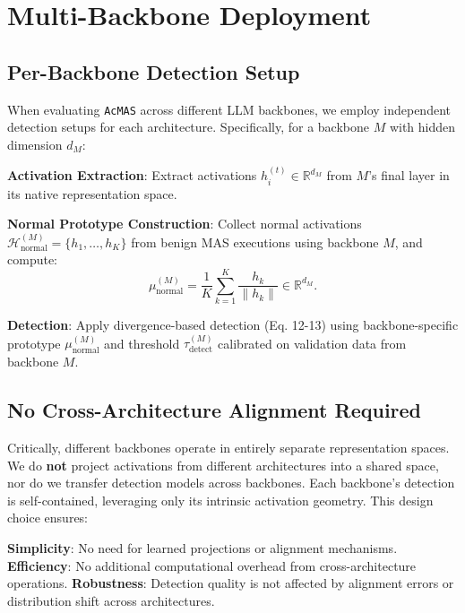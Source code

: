 \documentclass{article}
\newcommand{\app}{\texttt{AcMAS}}
\theoremstyle{plain}
\theoremstyle{definition}
\theoremstyle{remark}
\begin{document}
\section{Multi-Backbone Deployment}
\label{App:Heterogeneous}

\subsection{Per-Backbone Detection Setup}

When evaluating \app{} across different LLM backbones, we employ 
independent detection setups for each architecture. Specifically, 
for a backbone $M$ with hidden dimension $d_M$:

\textbf{Activation Extraction}: Extract activations 
$h_i^{(t)} \in \mathbb{R}^{d_M}$ from $M$'s final layer in its 
native representation space.

\textbf{Normal Prototype Construction}: Collect normal 
activations $\mathcal{H}_{\text{normal}}^{(M)} = \{h_1, \ldots, h_K\}$ 
from benign MAS executions using backbone $M$, and compute:
\begin{equation}
\mu_{\text{normal}}^{(M)} = \frac{1}{K} \sum_{k=1}^K \frac{h_k}{\|h_k\|} 
\in \mathbb{R}^{d_M}.
\end{equation}

\textbf{Detection}: Apply divergence-based detection 
(Eq. 12-13) using backbone-specific prototype $\mu_{\text{normal}}^{(M)}$ 
and threshold $\tau_{\text{detect}}^{(M)}$ calibrated on validation 
data from backbone $M$.


\subsection{No Cross-Architecture Alignment Required}

Critically, different backbones operate in entirely separate 
representation spaces. We do \textbf{not} project activations 
from different architectures into a shared space, nor do we 
transfer detection models across backbones. Each backbone's 
detection is self-contained, leveraging only its intrinsic 
activation geometry. This design choice ensures:

\textbf{Simplicity}: No need for learned projections or 
alignment mechanisms.
\textbf{Efficiency}: No additional computational overhead 
from cross-architecture operations.
\textbf{Robustness}: Detection quality is not affected by 
alignment errors or distribution shift across architectures.
\end{document}
